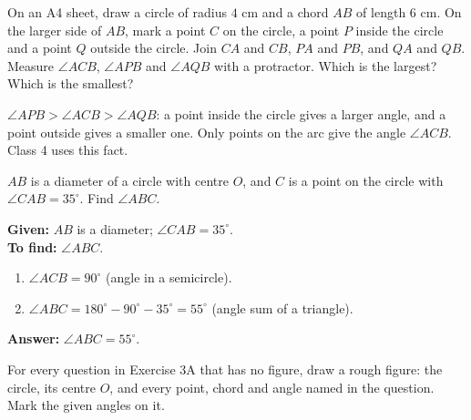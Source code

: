 \begin{solvefirst}
  \item On an A4 sheet, draw a circle of radius $4$ cm and a chord $AB$ of length $6$ cm. On the larger side of $AB$, mark a point $C$ on the circle, a point $P$ inside the circle and a point $Q$ outside the circle. Join $CA$ and $CB$, $PA$ and $PB$, and $QA$ and $QB$. Measure $\angle ACB$, $\angle APB$ and $\angle AQB$ with a protractor. Which is the largest? Which is the smallest?
\end{solvefirst}

\begin{answerblock}
$\angle APB>\angle ACB>\angle AQB$: a point inside the circle gives a larger angle, and a point outside gives a smaller one. Only points on the arc give the angle $\angle ACB$. Class 4 uses this fact.
\end{answerblock}

\begin{example}
$AB$ is a diameter of a circle with centre $O$, and $C$ is a point on the circle with $\angle CAB=35^\circ$. Find $\angle ABC$.
\end{example}


\textbf{Given:} $AB$ is a diameter; $\angle CAB=35^\circ$.\\
\textbf{To find:} $\angle ABC$.
\begin{enumerate}[leftmargin=1.8em,itemsep=1pt]
  \item $\angle ACB=90^\circ$ (angle in a semicircle).
  \item $\angle ABC=180^\circ-90^\circ-35^\circ=55^\circ$ (angle sum of a triangle).
\end{enumerate}
\textbf{Answer:} $\angle ABC=55^\circ$.

For every question in Exercise 3A that has no figure, draw a rough figure: the circle, its centre $O$, and every point, chord and angle named in the question. Mark the given angles on it.

